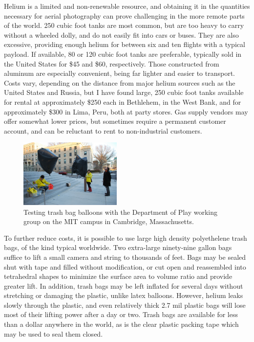 \documentclass[11pt,oneside,notitlepage]{report}
\begin{document}
{{Helium is a limited and non-renewable resource, and obtaining it in the quantities necessary for aerial photography can prove challenging in the more remote parts of the world. 250 cubic foot tanks are most common, but are too heavy to carry without a wheeled dolly, and do not easily fit into cars or buses. They are also excessive, providing enough helium for between six and ten flights with a typical payload. If available, 80 or 120 cubic foot tanks are preferable, typically sold in the United States for \$45 and \$60, respectively. Those constructed from aluminum are especially convenient, being far lighter and easier to transport. Costs vary, depending on the distance from major helium sources such as the United States and Russia, but I have found large, 250 cubic foot tanks available for rental at approximately \$250 each in Bethlehem, in the West Bank, and for approximately \$300 in Lima, Peru, both at party stores. Gas supply vendors may offer somewhat lower prices, but sometimes require a permanent customer account, and can be reluctant to rent to non-industrial customers. 

\begin{figure}
	\begin{flushright}
		\includegraphics[width=0.45\textwidth]{images/trash-bag-ballooning.jpg}
		\caption{Testing trash bag balloons with the Department of Play working group on the MIT campus in Cambridge, Massachusetts.}
	\end{flushright}
\end{figure}

To further reduce costs, it is possible to use large high density polyethelene trash bags, of the kind typical worldwide. Two extra-large ninety-nine gallon bags suffice to lift a small camera and string to thousands of feet. Bags may be sealed shut with tape and filled without modification, or cut open and reassembled into tetrahedral shapes to minimize the surface area to volume ratio and provide greater lift. In addition, trash bags may be left inflated for several days without stretching or damaging the plastic, unlike latex balloons. However, helium leaks slowly through the plastic, and even relatively thick 2.7 mil plastic bags will lose most of their lifting power after a day or two. Trash bags are available for less than a dollar anywhere in the world, as is the clear plastic packing tape which may be used to seal them closed.  

}}
\end{document}
